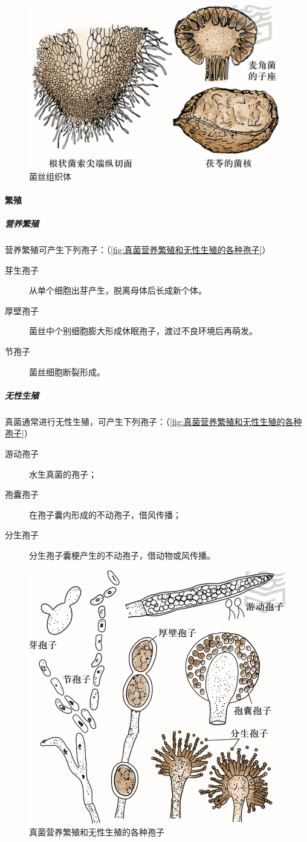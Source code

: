 \begin{figure}[htbp]
	\centering
	\includegraphics[width=0.6\linewidth]{Pics/菌丝组织体}
	\caption{菌丝组织体}
	\label{fig:菌丝组织体}
\end{figure}

\paragraph{繁殖}

\subparagraph{营养繁殖}

营养繁殖可产生下列孢子：（\autoref{fig:真菌营养繁殖和无性生殖的各种孢子}）

\begin{description}
	\item[芽生孢子] 从单个细胞出芽产生，脱离母体后长成新个体。
	\item[厚壁孢子] 菌丝中个别细胞膨大形成休眠孢子，渡过不良环境后再萌发。
	\item[节孢子] 菌丝细胞断裂形成。
\end{description}

\subparagraph{无性生殖}

真菌通常进行无性生殖，可产生下列孢子：（\autoref{fig:真菌营养繁殖和无性生殖的各种孢子}）
\begin{description}
	\item[游动孢子] 水生真菌的孢子；
	\item[孢囊孢子] 在孢子囊内形成的不动孢子，借风传播；
	\item[分生孢子] 分生孢子囊梗产生的不动孢子，借动物或风传播。
\end{description}

\begin{figure}[htbp]
	\centering
	\includegraphics[width=0.\linewidth]{Pics/真菌营养繁殖和无性生殖的各种孢子}
	\caption{真菌营养繁殖和无性生殖的各种孢子}
	\label{fig:真菌营养繁殖和无性生殖的各种孢子}
\end{figure}


